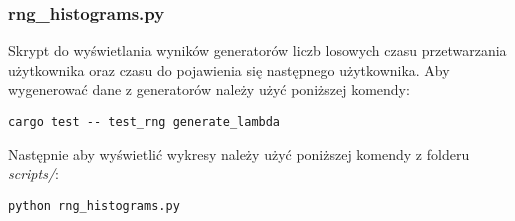 \subsubsection{rng\_histograms.py}
Skrypt do wyświetlania wyników generatorów liczb losowych czasu przetwarzania użytkownika oraz czasu do pojawienia się następnego użytkownika. Aby wygenerować dane z generatorów należy użyć poniższej komendy:
{
\selectfont 
\begin{verbatim}
cargo test -- test_rng generate_lambda
\end{verbatim}
}
\noindent Następnie aby wyświetlić wykresy należy użyć poniższej komendy z folderu \emph{scripts/}:
{
\selectfont 
\begin{verbatim}
python rng_histograms.py
\end{verbatim}
}